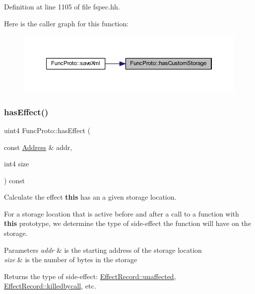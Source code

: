 Definition at line 1105 of file fspec.\+hh.

Here is the caller graph for this function\+:
\nopagebreak
\begin{figure}[H]
\begin{center}
\leavevmode
\includegraphics[width=350pt]{class_func_proto_a662b2cce15487591fabd9632a335986c_icgraph}
\end{center}
\end{figure}
\mbox{\label{class_func_proto_a906c0e176919bd0ced34e337445c2bf7}} 
\subsubsection{\texorpdfstring{hasEffect()}{hasEffect()}}
{\footnotesize\ttfamily uint4 Func\+Proto\+::has\+Effect (\begin{DoxyParamCaption}\item[{const \mbox{\hyperlink{class_address}{Address}} \&}]{addr,  }\item[{int4}]{size }\end{DoxyParamCaption}) const}



Calculate the effect {\bfseries{this}} has an a given storage location. 

For a storage location that is active before and after a call to a function with {\bfseries{this}} prototype, we determine the type of side-\/effect the function will have on the storage. 
\begin{DoxyParams}{Parameters}
{\em addr} & is the starting address of the storage location \\
\hline
{\em size} & is the number of bytes in the storage \\
\hline
\end{DoxyParams}
\begin{DoxyReturn}{Returns}
the type of side-\/effect\+: \mbox{\hyperlink{class_effect_record_a9a77875d39274819c56d6e4df5f23ab0a3488da6d6b149499cbe384f7b57d0564}{Effect\+Record\+::unaffected}}, \mbox{\hyperlink{class_effect_record_a9a77875d39274819c56d6e4df5f23ab0aacd8991c4ebdeb4057e15faf1d08abc2}{Effect\+Record\+::killedbycall}}, etc. 
\end{DoxyReturn}


